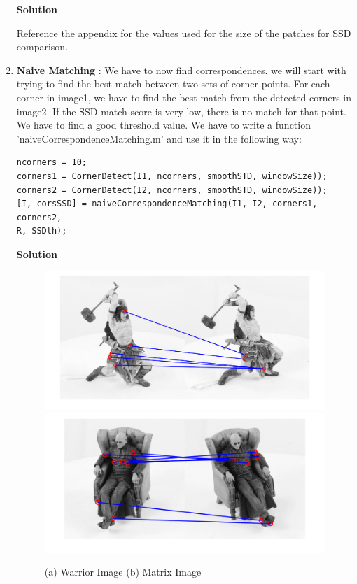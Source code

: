 \documentclass{assignment}
\begin{document}
\begin{problemlist}
\begin{enumerate}[label*=\arabic*.]
\textbf{Solution}

Reference the appendix for the values used for the size of the patches for SSD comparison.\\

\item \textbf{Naive Matching} : We have to now find correspondences. we will start with trying to find the best match between two sets of corner points. For each corner in image1, we have to find the best match from the detected corners in image2. If the SSD match score is very low, there is no match for that point. We have to find a good threshold value. We have to write a function 'naiveCorrespondenceMatching.m' and use it in the following way:

\begin{verbatim}
ncorners = 10;
corners1 = CornerDetect(I1, ncorners, smoothSTD, windowSize));
corners2 = CornerDetect(I2, ncorners, smoothSTD, windowSize));
[I, corsSSD] = naiveCorrespondenceMatching(I1, I2, corners1, corners2, 
R, SSDth);
\end{verbatim}

\textbf{Solution}

\begin{figure}[H]
\centering
\includegraphics[width=0.9\columnwidth]{w6_3} \\
\includegraphics[width=0.95\columnwidth]{m6_3} 
\caption{(a) Warrior Image (b) Matrix Image}
\label{fig:i6_3}
\end{figure}


\end{enumerate}
\end{problemlist}
\end{document}
